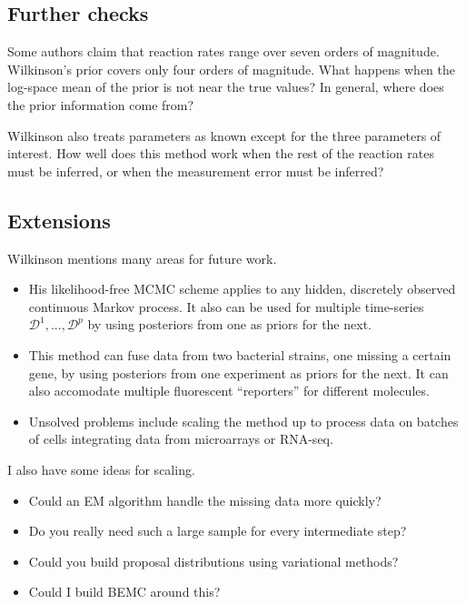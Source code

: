 \documentclass{article}
\begin{document}

 \subsection{Further checks}
Some authors \cite{protein_interaction} claim that reaction rates range over seven orders of magnitude. Wilkinson's prior covers only four orders of magnitude. What happens when the log-space mean of the prior is not near the true values? In general, where does the prior information come from?

Wilkinson also treats parameters as known except for the three parameters of interest. How well does this method work when the rest of the reaction rates must be inferred, or when the measurement error must be inferred?

 \subsection{Extensions}

Wilkinson mentions many areas for future work. 
\begin{itemize}
\item His likelihood-free MCMC scheme applies to any hidden, discretely observed continuous Markov process. It also can be used for multiple time-series $\mathcal{D}^1, ..., \mathcal{D}^p$ by using posteriors from one as priors for the next.
\item This method can fuse data from two bacterial strains, one missing a certain gene, by using posteriors from one experiment as priors for the next. It can also accomodate multiple fluorescent ``reporters'' for different molecules.
\item Unsolved problems include scaling the method up to process data on batches of cells integrating data from microarrays or RNA-seq.
\end{itemize}

I also have some ideas for scaling.
\begin{itemize}
\item Could an EM algorithm handle the missing data more quickly?
\item Do you really need such a large sample for every intermediate step? 
\item Could you build proposal distributions using variational methods?
\item Could I build BEMC around this?
\end{itemize}
\end{document}
